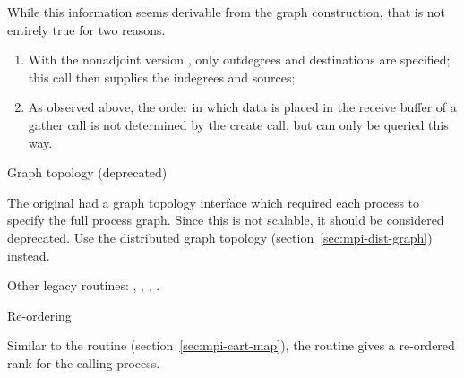 While this information seems derivable from the graph construction,
that is not entirely true for two reasons.
\begin{enumerate}
\item With the nonadjoint version ,
  only outdegrees and destinations are specified; this call then supplies
  the indegrees and sources;
\item As observed above, the order in which data is placed in the
  receive buffer of a gather call is not determined by the create call,
  but can only be queried this way.
\end{enumerate}

 {Graph topology (deprecated)}
\label{sec:mpi-1-graph}

The original  had a graph topology interface
which required each process to specify the full process graph. Since
this is not scalable, it should be considered deprecated. Use the
distributed graph topology (section~\ref{sec:mpi-dist-graph}) instead.

Other legacy routines: 
,
,
,
.

 {Re-ordering}

Similar to the  routine
(section~\ref{sec:mpi-cart-map}),
the routine  gives a re-ordered rank
for the calling process.

